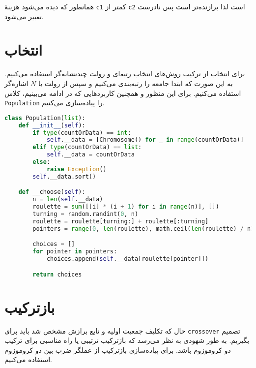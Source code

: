 \documentclass[a4paper, 12pt]{article}
\theoremstyle{definition}
\begin{document}
همانطور که دیده می‌شود هزینهٔ
\texttt{c1}
کمتر از
\texttt{c2}
است لذا برازنده‌تر است پس
نادرست تعبیر می‌شود.

\section{انتخاب}
برای انتخاب از ترکیب روش‌های انتخاب رتبه‌ای و رولت چندنشانه‌گر استفاده می‌کنیم. به این صورت که ابتدا جامعه را رتبه‌بندی می‌کنیم و سپس از رولت با
$N$
اشاره‌گر استفاده می‌کنیم. برای این منظور و همچنین کاربردهایی که در ادامه می‌بینیم، کلاس
\texttt{Population}
را پیاده‌سازی می‌کنیم.

\LTR
\begin{lstlisting}[language=Python]
class Population(list):
    def __init__(self):
        if type(countOrData) == int:
            self.__data = [Chromosome() for _ in range(countOrData)]
        elif type(countOrData) == list:
            self.__data = countOrData
        else:
            raise Exception()
        self.__data.sort()

    def __choose(self):
        n = len(self.__data)
        roulette = sum([[i] * (i + 1) for i in range(n)], [])
        turning = random.randint(0, n)
        roulette = roulette[turning:] + roulette[:turning]
        pointers = range(0, len(roulette), math.ceil(len(roulette) / n))

        choices = []
        for pointer in pointers:
            choices.append(self.__data[roulette[pointer]])

        return choices
\end{lstlisting}
\RTL


\section{بازترکیب}
حال که تکلیف جمعیت اولیه و تابع برازش مشخص شد باید برای
\texttt{crossover}
تصمیم بگیریم. به طور شهودی به نظر می‌رسد که بازترکیب ترتیبی یا
راه مناسبی برای ترکیب دو کروموزوم باشد. برای پیاده‌سازی بازترکیب از عملگر ضرب بین دو کروموزوم استفاده می‌کنیم.
\end{document}
